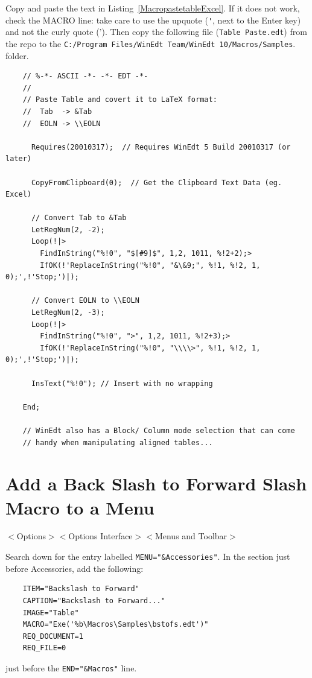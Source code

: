 Copy and paste the text in Listing~\ref{MacropastetableExcel}. If it does not work,  check the MACRO line:  take care to use the upquote (\verb+'+,  next to the Enter key) and not the curly quote (').
Then copy the following file (\lstinline{Table Paste.edt}) from the repo to the 
\lstinline{C:/Program Files/WinEdt Team/WinEdt 10/Macros/Samples}.
folder.

\begin{lstlisting}
    // %-*- ASCII -*- -*- EDT -*-
    //
    // Paste Table and covert it to LaTeX format:
    //  Tab  -> &Tab
    //  EOLN -> \\EOLN

      Requires(20010317);  // Requires WinEdt 5 Build 20010317 (or later)

      CopyFromClipboard(0);  // Get the Clipboard Text Data (eg. Excel)

      // Convert Tab to &Tab
      LetRegNum(2, -2);
      Loop(!|>
        FindInString("%!0", "$[#9]$", 1,2, 1011, %!2+2);>
        IfOK(!'ReplaceInString("%!0", "&\&9;", %!1, %!2, 1, 0);',!'Stop;')|);

      // Convert EOLN to \\EOLN
      LetRegNum(2, -3);
      Loop(!|>
        FindInString("%!0", ">", 1,2, 1011, %!2+3);>
        IfOK(!'ReplaceInString("%!0", "\\\\>", %!1, %!2, 1, 0);',!'Stop;')|);

      InsText("%!0"); // Insert with no wrapping

    End;

    // WinEdt also has a Block/ Column mode selection that can come
    // handy when manipulating aligned tables...
\end{lstlisting}




\section{Add a Back Slash to Forward Slash Macro to a Menu}
\label{sec:bsfs}

$<$Options$>$$<$Options Interface$>$$<$Menus and Toolbar$>$

Search down for the entry labelled \lstinline{MENU="&Accessories"}.
In the section just before Accessories, add the following:
\begin{lstlisting}
    ITEM="Backslash to Forward"
    CAPTION="Backslash to Forward..."
    IMAGE="Table"
    MACRO="Exe('%b\Macros\Samples\bstofs.edt')"
    REQ_DOCUMENT=1
    REQ_FILE=0
\end{lstlisting}
just before the \lstinline{END="&Macros"} line.

